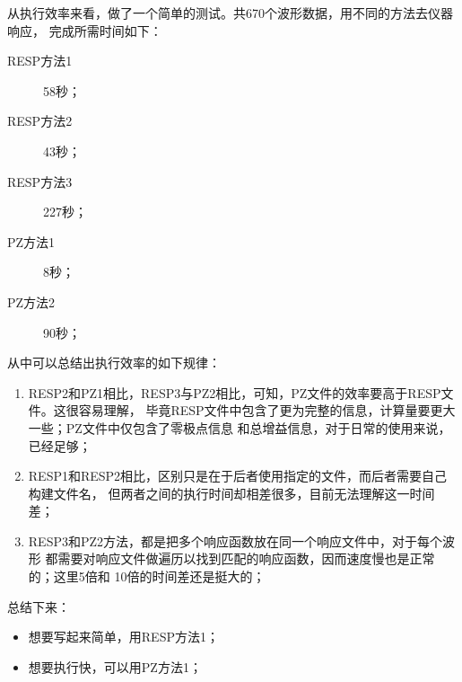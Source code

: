 从执行效率来看，做了一个简单的测试。共670个波形数据，用不同的方法去仪器响应，
完成所需时间如下：
\begin{description}
\item [RESP方法1] 58秒；
\item [RESP方法2] 43秒；
\item [RESP方法3] 227秒；
\item [PZ方法1] 8秒；
\item [PZ方法2] 90秒；
\end{description}
从中可以总结出执行效率的如下规律：
\begin{enumerate}
\item RESP2和PZ1相比，RESP3与PZ2相比，可知，PZ文件的效率要高于RESP文件。这很容易理解，
    毕竟RESP文件中包含了更为完整的信息，计算量要更大一些；PZ文件中仅包含了零极点信息
    和总增益信息，对于日常的使用来说，已经足够；
\item RESP1和RESP2相比，区别只是在于后者使用指定的文件，而后者需要自己构建文件名，
    但两者之间的执行时间却相差很多，目前无法理解这一时间差；
\item RESP3和PZ2方法，都是把多个响应函数放在同一个响应文件中，对于每个波形
    都需要对响应文件做遍历以找到匹配的响应函数，因而速度慢也是正常的；这里5倍和
    10倍的时间差还是挺大的；
\end{enumerate}

总结下来：
\begin{itemize}
\item 想要写起来简单，用RESP方法1；
\item 想要执行快，可以用PZ方法1；
\end{itemize}
